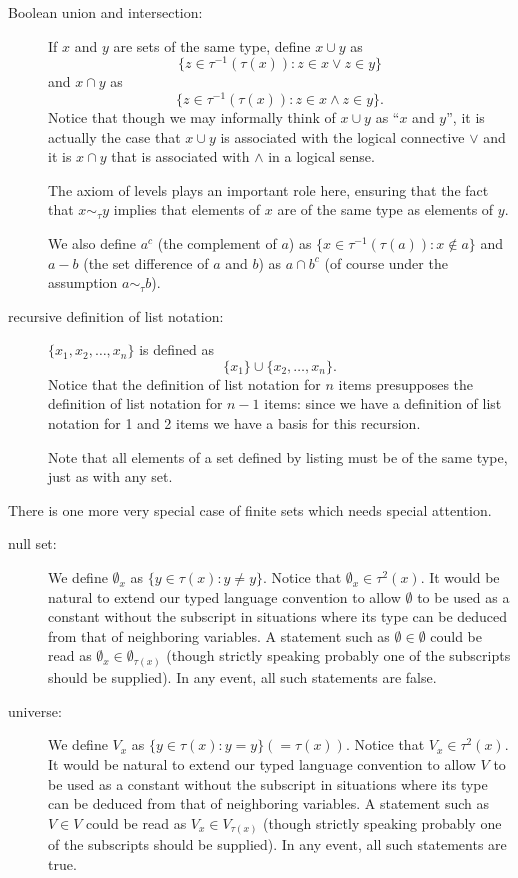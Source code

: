 \documentclass[12pt]{book}
\begin{document}
\begin{description}

\item[Boolean union and intersection:] If $x$ and $y$ are sets of the same type, define
$x \cup y$ as $$\{z \in \tau^{-1}(\tau(x)): z \in x \vee z \in y\}$$ and $x \cap y$ as $$\{z \in \tau^{-1}(\tau(x)): z \in x \wedge z \in y\}.$$  Notice that though we may informally
think of $x \cup y$ as ``$x$ and $y$'', it is actually the case that
$x \cup y$ is associated with the logical connective $\vee$ and it is
$x \cap y$ that is associated with $\wedge$ in a logical sense.

The axiom of levels plays an important role here, ensuring that the fact that $x \sim_\tau y$ implies that elements of $x$ are of the same type as elements of $y$.

We also define $a^c$ (the complement of $a$) as $\{x \in \tau^{-1}(\tau(a)): x \not\in
a\}$ and $a-b$ (the set difference of $a$ and $b$) as $a \cap b^c$ (of course under the assumption $a \sim_\tau b$).

\item[recursive definition of list notation:] $\{x_1,x_2,\ldots,x_n\}$
is defined as $$\{x_1\} \cup \{x_2,\ldots,x_n\}.$$  Notice that the
definition of list notation for $n$ items presupposes the definition
of list notation for $n-1$ items: since we have a definition of list
notation for 1 and 2 items we have a basis for this recursion.

Note that all elements of a set defined by listing must be of the same
type, just as with any set.

\end{description}

There is one more very special case of finite sets which needs special
attention.

\begin{description}

\item[null set:]  We define $\emptyset_x$ as $\{y \in \tau(x):y \neq y\}$.  Notice that $\emptyset_x \in \tau^2(x)$.  It would
be natural to extend our typed language convention to allow $\emptyset$ to be used as a constant without the subscript in situations where its
type can be deduced from that of neighboring variables.  A statement such as $\emptyset \in \emptyset$ could be read as
$\emptyset_x \in \emptyset_{\tau(x)}$ (though strictly speaking probably one of the subscripts should be supplied).  In any event, all such statements are false.

\item[universe:] We define $V_x$ as $\{y \in \tau(x):y = y\} (= \tau(x))$.  Notice that $V_x \in \tau^2(x)$.  It would
be natural to extend our typed language convention to allow $V$ to be used as a constant without the subscript in situations where its
type can be deduced from that of neighboring variables.  A statement such as $V \in V$ could be read as
$V_x \in V_{\tau(x)}$ (though strictly speaking probably one of the subscripts should be supplied).  In any event, all such statements are true.

\end{description}
\end{document}
